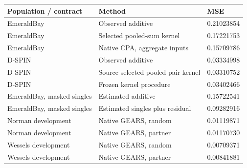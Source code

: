 \begin{tabular}{lll}
\toprule
Population / contract & Method & MSE \\
\midrule
EmeraldBay & Observed additive & 0.21023854 \\
EmeraldBay & Selected pooled-sum kernel & 0.17221753 \\
EmeraldBay & Native CPA, aggregate inputs & 0.15709786 \\
D-SPIN & Observed additive & 0.03334998 \\
D-SPIN & Source-selected pooled-pair kernel & 0.03310752 \\
D-SPIN & Frozen kernel procedure & 0.03402466 \\
EmeraldBay, masked singles & Estimated additive & 0.15722541 \\
EmeraldBay, masked singles & Estimated singles plus residual & 0.09282916 \\
Norman development & Native GEARS, random & 0.01119871 \\
Norman development & Native GEARS, partner & 0.01170730 \\
Wessels development & Native GEARS, random & 0.00709371 \\
Wessels development & Native GEARS, partner & 0.00841881 \\
\bottomrule
\end{tabular}
